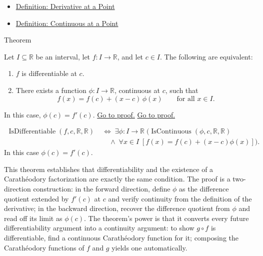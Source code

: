 \begin{dependencies}
\begin{itemize}
  \item \hyperref[def:derivative-at-a-point]{Definition: Derivative at a Point}
  \item \hyperref[def:continuous-at-point]{Definition: Continuous at a Point}
\end{itemize}
\end{dependencies}


\begin{theorembox}{Theorem}
\begin{theorem}
\label{thm:caratheodory-characterization-of-differentiability}
Let $I \subseteq \mathbb{R}$ be an interval, let $f : I \to \mathbb{R}$, and let $c \in I$. The following are equivalent:
\begin{enumerate}[label=(\roman*)]
\item $f$ is differentiable at $c$.
\item There exists a function $\phi : I \to \mathbb{R}$, continuous at $c$, such that
\[
f(x) = f(c) + (x-c)\,\phi(x) \qquad \text{for all } x \in I.
\]
\end{enumerate}
In this case, $\phi(c) = f'(c)$.
\hyperref[prf:caratheodory-characterization-of-differentiability]{Go to proof.}
\hyperref[prf:caratheodory-characterization-of-differentiability]{Go to proof.}
\end{theorem}
\end{theorembox}

\begin{remark*}
\begin{align*}
\operatorname{IsDifferentiable}(f,c,\mathbb{R},\mathbb{R})
\;&\iff\;
\exists\phi:I\to\mathbb{R}\;
\bigl(\operatorname{IsContinuous}(\phi,c,\mathbb{R},\mathbb{R})\\
&\quad\land\;\forall x \in I\;[f(x)=f(c)+(x-c)\phi(x)]\bigr).
\end{align*}
In this case $\phi(c) = f'(c)$.
\end{remark*}

\begin{remark*}[Interpretation]
This theorem establishes that differentiability and the existence of a Carath\'{e}odory factorization are exactly the same condition. The proof is a two-direction construction: in the forward direction, define $\phi$ as the difference quotient extended by $f'(c)$ at $c$ and verify continuity from the definition of the derivative; in the backward direction, recover the difference quotient from $\phi$ and read off its limit as $\phi(c)$. The theorem's power is that it converts every future differentiability argument into a continuity argument: to show $g \circ f$ is differentiable, find a continuous Carath\'{e}odory function for it; composing the Carath\'{e}odory functions of $f$ and $g$ yields one automatically.
\end{remark*}


